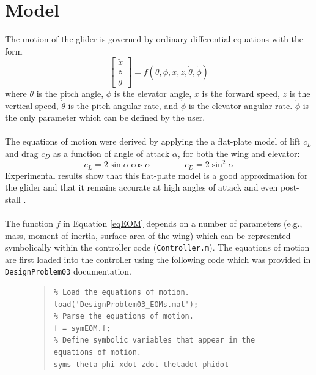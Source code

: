 \documentclass[12pt]{article}
\begin{document}
\section{Model}
The motion of the glider is governed by ordinary differential equations with the form
\begin{equation}
\label{eqEOM}
\begin{bmatrix} \ddot{x} \\ \ddot{z} \\ \ddot{\theta} \end{bmatrix} = f(\theta,\phi,\dot{x},\dot{z},\dot{\theta},\dot{\phi})
\end{equation}
where $\theta$ is the pitch angle, $\phi$ is the elevator angle, $\dot{x}$ is the forward speed, $\dot{z}$ is the vertical speed, $\dot{\theta}$ is the pitch angular rate, and $\dot{\phi}$ is the elevator angular rate.  $\dot{\phi}$ is the only parameter which can be defined by the user. 
\\ \\
The equations of motion were derived by applying the a flat-plate model of lift $c_{L}$ and drag $c_{D}$ as a function of angle of attack $\alpha$, for both the wing and elevator:
\begin{equation*}
c_{L} = 2\sin\alpha \cos\alpha
\qquad\qquad
c_{D} = 2\sin^{2}\alpha
\end{equation*}
Experimental results show that this flat-plate model is a good approximation for the glider and that it remains accurate at high angles of attack and even post-stall \cite{Moore2014}. 
\\ \\
The function $f$ in Equation \eqref{eqEOM} depends on a number of parameters (e.g., mass, moment of inertia, surface area of the wing) which can be represented symbolically within the controller code (\lstinline|Controller.m|). The equations of motion are first loaded into the controller using the following code which was provided in \lstinline!DesignProblem03! documentation.
\begin{figure}[H]
\begin{quote}
\begin{lstlisting}
% Load the equations of motion.
load('DesignProblem03_EOMs.mat');
% Parse the equations of motion.
f = symEOM.f;
% Define symbolic variables that appear in the equations of motion.
syms theta phi xdot zdot thetadot phidot
\end{lstlisting}
\end{quote}
\end{figure}
\end{document}
